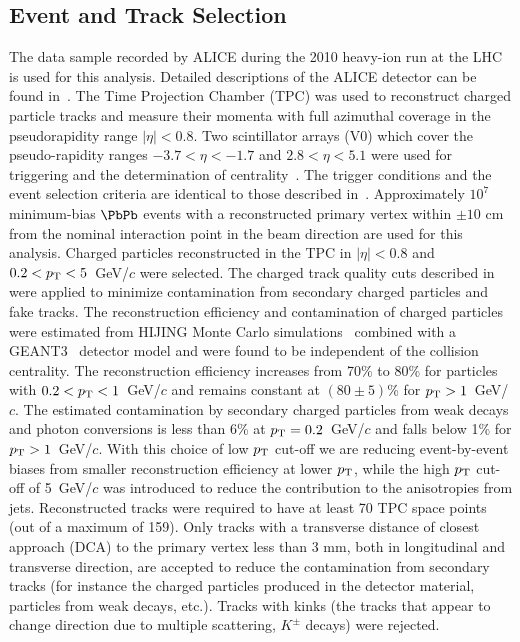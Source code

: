\subsection{Event and Track Selection}
\label{sec:experiment}
The data sample recorded by ALICE during the 2010 heavy-ion run at the
LHC is used for this analysis. Detailed descriptions of the ALICE
detector can be found
in~\cite{Aamodt:2008zz,Carminati:2004fp,Alessandro:2006yt}. The Time
Projection Chamber (TPC) was used to reconstruct charged particle
tracks and measure their momenta with full azimuthal coverage in the
pseudorapidity range $|\eta|<0.8$. Two scintillator
arrays (V0) which cover the pseudo-rapidity ranges $-3.7<\eta<-1.7$
and $2.8<\eta<5.1$ were used for triggering and the determination of
centrality~\cite{Aamodt:2010cz}. The trigger
conditions and the event selection criteria are identical to those
described in~\cite{Aamodt:2010pa, Aamodt:2010cz}.
Approximately $10^7$ minimum-bias $\PbPb$ events with
a reconstructed primary vertex within $\pm 10$ cm from the nominal
interaction point in the beam direction are used for this
analysis. Charged particles reconstructed in the TPC in $|\eta|<0.8$
and $0.2<p_{\rm T}<5$~GeV/$c$ were selected. The charged track quality cuts
described in~\cite{Aamodt:2010pa} were applied to minimize
contamination from secondary charged particles and fake tracks.
The reconstruction efficiency and contamination of charged particles
were estimated from {\sc HIJING} Monte Carlo
simulations~\cite{Wang:1991hta} combined with a {\sc
GEANT3}~\cite{Brun:1994aa} detector model and were found to be independent of
the collision centrality. The reconstruction efficiency increases from
70\% to 80\% for particles with $0.2<p_{\rm T}<1$~GeV/$c$ and remains
constant at $(80 \pm 5)$\% for $p_{\rm T}>1$~GeV/$c$. The estimated
contamination by secondary charged particles from weak decays and
photon conversions is less than 6\% at $p_{\rm T}=0.2$~GeV/$c$ and falls
below 1\% for $p_{\rm T}>1$~GeV/$c$.
With this choice of low $p_{\rm T}$ cut-off we are reducing event-by-event biases from smaller reconstruction efficiency 
at lower $p_{\rm T}$, while the high $p_{\rm T}$ cut-off of 5~GeV/$c$ was introduced to reduce the contribution to the anisotropies from jets. 
Reconstructed tracks were required to have at least 70 TPC space points (out of a maximum of 159). 
Only tracks with a transverse distance of closest approach (DCA) to the primary vertex less than 3 mm, both in longitudinal and transverse direction, are accepted to reduce the contamination from secondary tracks (for instance the charged particles produced 
in the detector material, particles from weak decays, etc.). 
Tracks with kinks (the tracks that appear to change direction due to multiple scattering, $K^{\pm}$ decays) were rejected.


